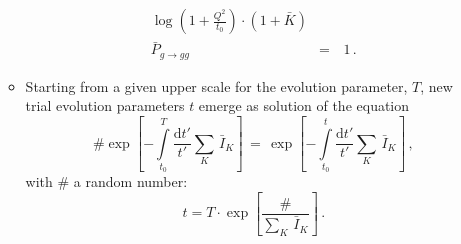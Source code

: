 \documentclass[a4]{article}
\newcommand{\done}{\mathrm{d}}
\begin{document}
\begin{enumerate}
\begin{itemize}
\begin{eqnarray}
      \log\left(1+\frac{Q^2}{t_0}\right)\cdot(1+\bar{K})\nonumber\\
      \bar{P}_{g\to gg}\, &=& \,1\,.
    \end{eqnarray}
  \item Starting from a given upper scale for the evolution parameter, $T$, new trial evolution
    parameters $t$ emerge as solution of the equation
    \begin{equation}
      \#\exp\left[-\int\limits_{t_0}^T\frac{\done t'}{t'}\sum\limits_K\,\bar{I}_K\right]\,=\,
      \exp\left[-\int\limits_{t_0}^t\frac{\done t'}{t'}\sum\limits_K\,\bar{I}_K\right]\,,
    \end{equation}
    with $\#$ a random number:
    \begin{equation}
      t = T\cdot\exp\left[\frac{\#}{\sum\limits_K\,\bar{I}_K}\right]\,.
    \end{equation}   
  \end{itemize}
\end{enumerate}
\end{document}

